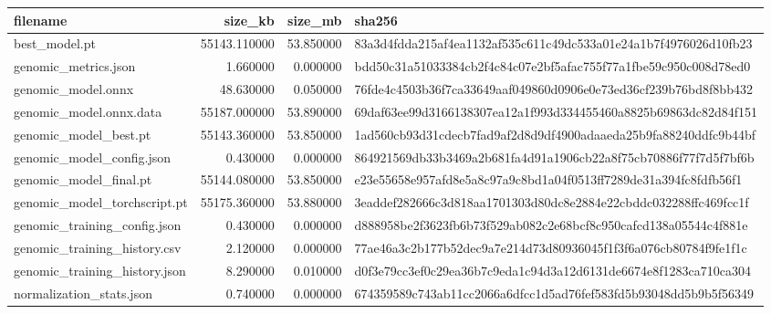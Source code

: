 \begin{tabular}{lrrl}
\toprule
filename & size_kb & size_mb & sha256 \\
\midrule
best_model.pt & 55143.110000 & 53.850000 & 83a3d4fdda215af4ea1132af535c611c49dc533a01e24a1b7f4976026d10fb23 \\
genomic_metrics.json & 1.660000 & 0.000000 & bdd50c31a51033384cb2f4c84c07e2bf5afac755f77a1fbe59c950c008d78ed0 \\
genomic_model.onnx & 48.630000 & 0.050000 & 76fde4c4503b36f7ca33649aaf049860d0906e0e73ed36cf239b76bd8f8bb432 \\
genomic_model.onnx.data & 55187.000000 & 53.890000 & 69daf63ee99d3166138307ea12a1f993d334455460a8825b69863dc82d84f151 \\
genomic_model_best.pt & 55143.360000 & 53.850000 & 1ad560cb93d31cdecb7fad9af2d8d9df4900adaaeda25b9fa88240ddfc9b44bf \\
genomic_model_config.json & 0.430000 & 0.000000 & 864921569db33b3469a2b681fa4d91a1906cb22a8f75cb70886f77f7d5f7bf6b \\
genomic_model_final.pt & 55144.080000 & 53.850000 & e23e55658e957afd8e5a8c97a9c8bd1a04f0513ff7289de31a394fc8fdfb56f1 \\
genomic_model_torchscript.pt & 55175.360000 & 53.880000 & 3eaddef282666c3d818aa1701303d80dc8e2884e22cbddc032288ffc469fcc1f \\
genomic_training_config.json & 0.430000 & 0.000000 & d888958be2f3623fb6b73f529ab082c2e68bcf8c950cafcd138a05544c4f881e \\
genomic_training_history.csv & 2.120000 & 0.000000 & 77ae46a3c2b177b52dec9a7e214d73d80936045f1f3f6a076cb80784f9fe1f1c \\
genomic_training_history.json & 8.290000 & 0.010000 & d0f3e79cc3ef0c29ea36b7c9eda1c94d3a12d6131de6674e8f1283ca710ca304 \\
normalization_stats.json & 0.740000 & 0.000000 & 674359589c743ab11cc2066a6dfcc1d5ad76fef583fd5b93048dd5b9b5f56349 \\
\bottomrule
\end{tabular}
